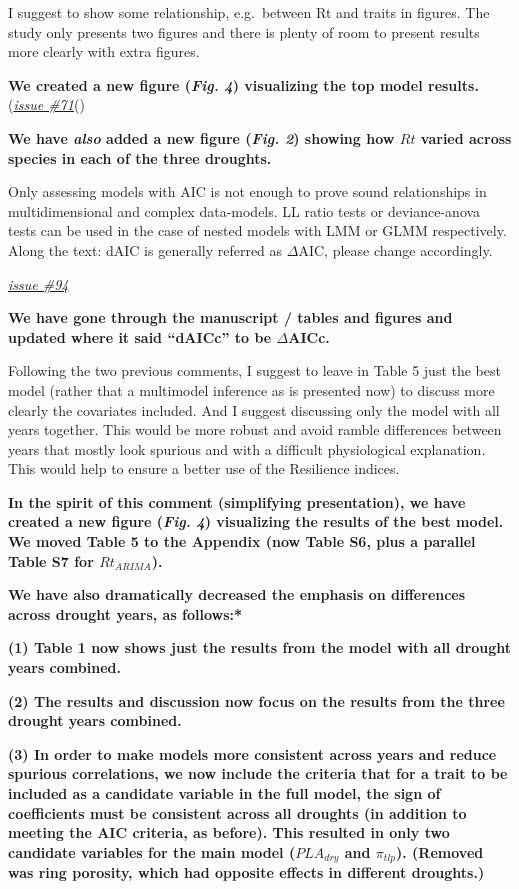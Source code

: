 \documentclass[
]{article}
\begin{document}
I suggest to show some relationship, e.g.~between Rt and traits in
figures. The study only presents two figures and there is plenty of room
to present results more clearly with extra figures.

\textbf{We created a new figure (\emph{Fig. 4}) visualizing the top
model results.}
(\href{https://github.com/SCBI-ForestGEO/McGregor_climate-sensitivity-variation/issues/71}{\emph{issue
\#71}}()

\textbf{We have \emph{also} added a new figure (\emph{Fig. 2}) showing
how \(Rt\) varied across species in each of the three droughts.}

Only assessing models with AIC is not enough to prove sound
relationships in multidimensional and complex data-models. LL ratio
tests or deviance-anova tests can be used in the case of nested models
with LMM or GLMM respectively. Along the text: dAIC is generally
referred as \(\Delta\)AIC, please change accordingly.

\href{https://github.com/SCBI-ForestGEO/McGregor_climate-sensitivity-variation/issues/94}{\emph{issue
\#94}}

\textbf{We have gone through the manuscript / tables and figures and
updated where it said ``dAICc'' to be \(\Delta\)AICc. }

Following the two previous comments, I suggest to leave in Table 5 just
the best model (rather that a multimodel inference as is presented now)
to discuss more clearly the covariates included. And I suggest
discussing only the model with all years together. This would be more
robust and avoid ramble differences between years that mostly look
spurious and with a difficult physiological explanation. This would help
to ensure a better use of the Resilience indices.

\textbf{In the spirit of this comment (simplifying presentation), we
have created a new figure (\emph{Fig. 4}) visualizing the results of the
best model. We moved Table 5 to the Appendix (now Table S6, plus a
parallel Table S7 for \(Rt_{ARIMA}\)).}

\textbf{We have also dramatically decreased the emphasis on differences
across drought years, as follows:* }

\textbf{(1) Table 1 now shows just the results from the model with all
drought years combined.}

\textbf{(2) The results and discussion now focus on the results from the
three drought years combined.}

\textbf{(3) In order to make models more consistent across years and
reduce spurious correlations, we now include the criteria that for a
trait to be included as a candidate variable in the full model, the sign
of coefficients must be consistent across all droughts (in addition to
meeting the AIC criteria, as before). This resulted in only two
candidate variables for the main model (\(PLA_{dry}\) and
\(\pi_{tlp}\)). (Removed was ring porosity, which had opposite effects
in different droughts.)}
\end{document}
